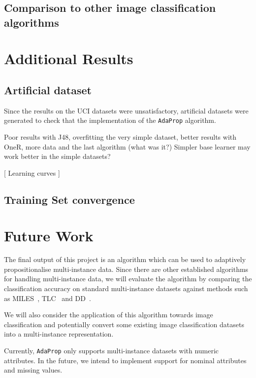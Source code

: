 \documentclass[a4paper,12pt]{report} %
\newcommand{\AdaProp}{\texttt{AdaProp}\xspace}
\begin{document}
\section{Comparison to other image classification algorithms}

\chapter{Additional Results}
\section{Artificial dataset}
Since the results on the UCI datasets were unsatisfactory, 
    artificial datasets were generated to check that the 
    implementation of the \AdaProp algorithm.
    
Poor results with J48, overfitting the very simple dataset, better results with 
    OneR, more data and the last algorithm (what was it?)
Simpler base learner may work better in the simple datasets?

[ Learning curves ]

\section{Training Set convergence}


\chapter{Future Work}

The final output of this project is an algorithm 
    which can be used to adaptively propositionalise multi-instance data. 
Since there are other established algorithms for handling multi-instance data, 
    we will evaluate the algorithm by comparing the classification accuracy 
    on standard multi-instance datasets against methods such as 
    MILES~\cite{Chen2006}, TLC~\cite{Weidmann2003} and DD~\cite{Maron98mil}.

We will also consider the application of this algorithm towards image classification and 
    potentially convert some existing image classification
    datasets into a multi-instance representation.

Currently, \AdaProp only supports multi-instance datasets with 
    numeric attributes.
In the future, we intend to implement support for
    nominal attributes and missing values.
\end{document}
